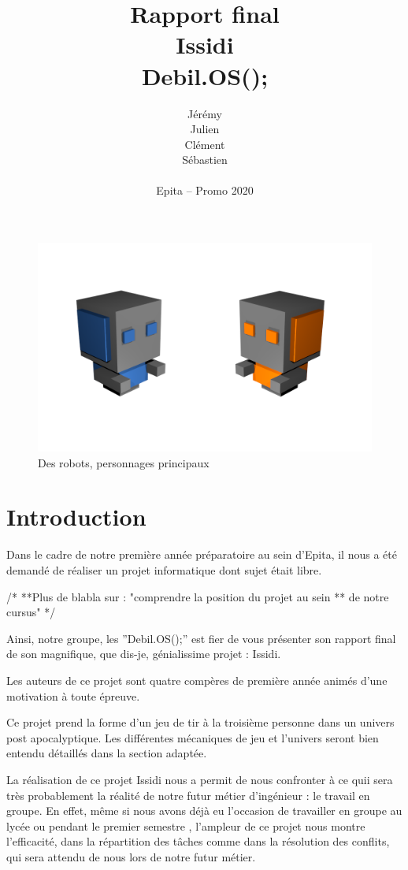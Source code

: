 ﻿\documentclass[12pt]{article}
\title{Rapport final\\
		Issidi\\
		Debil.OS();}
\author{Jérémy \bsc{Beuvry}\\
		Julien \bsc{Boulicaut}\\
		Clément \bsc{Finck}\\
		Sébastien \bsc{Fleury}\\
		\\
		Epita -- Promo 2020}
\begin{document}
\maketitle

\begin{figure}[!t]
\centering
\includegraphics[scale=0.4]{front_page.png}
\caption{Des robots, personnages principaux}
\end{figure}

\newpage
\tableofcontents
\newpage
\listoffigures
\newpage

\section{Introduction}
Dans le cadre de notre première année préparatoire au sein d'Epita, 
il nous a été demandé de réaliser un projet informatique dont sujet
était libre.

/*
**Plus de blabla sur : "comprendre la position du projet au sein 
** de notre cursus"
*/

Ainsi, notre groupe, les ''Debil.OS();'' est fier de vous présenter son 
rapport final de son magnifique, que dis-je, génialissime projet :
Issidi.

Les auteurs de ce projet sont quatre compères de première année animés
d'une motivation à toute épreuve.

Ce projet prend la forme d'un jeu de tir à la troisième personne dans
un univers post apocalyptique. Les différentes mécaniques de jeu et
l'univers seront bien entendu détaillés dans la section adaptée.

La réalisation de ce projet Issidi nous a permit de nous confronter à
ce quii sera très probablement la réalité de notre futur métier
d'ingénieur : le travail en groupe. En effet, même si nous avons déjà eu
l'occasion de travailler en groupe au lycée ou pendant le premier semestre
, l'ampleur de ce projet nous montre l'efficacité, dans la répartition
des tâches comme dans la résolution des conflits, qui sera attendu
de nous lors de notre futur métier.
\end{document}

